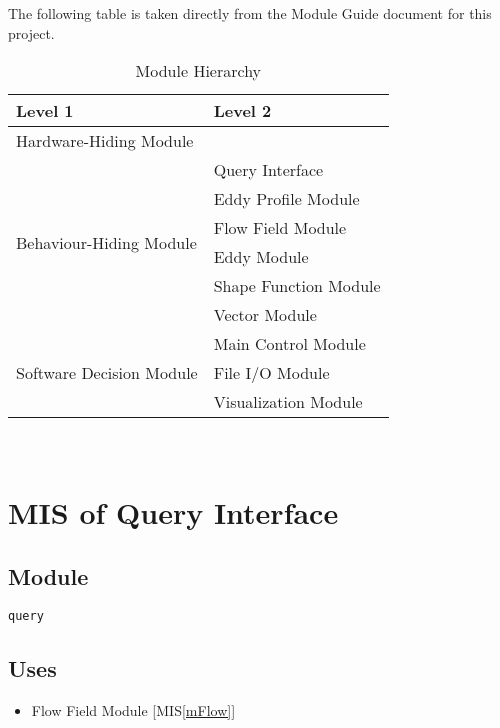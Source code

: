 \documentclass[12pt, titlepage]{article}
\begin{document}
The following table is taken directly from the Module Guide document for this project.

\begin{table}[h!]
  \centering
  \begin{tabular}{p{} p{}}
  \toprule
  \textbf{Level 1} & \textbf{Level 2}\\
  \midrule
  
  {Hardware-Hiding Module} & ~ \\
  \midrule
  
  \multirow{6}{0.3\textwidth}{Behaviour-Hiding Module}
  & Query Interface\\
  & Eddy Profile Module\\
  & Flow Field Module\\
  & Eddy Module\\
  & Shape Function Module\\
  & Vector Module\\
  \midrule
  
  \multirow{3}{0.3\textwidth}{Software Decision Module} 
  & Main Control Module\\
  & File I/O Module\\
  & Visualization Module\\
  \bottomrule

\end{tabular}
\caption{Module Hierarchy}
\label{TblMH}
\end{table}

\newpage
~\newpage

\section{MIS of Query Interface} \label{mQuery} 



\subsection{Module}
\texttt{query}

\subsection{Uses}
\begin{itemize}
\item Flow Field Module [MIS\ref{mFlow}]
\end{itemize}
\end{document}

